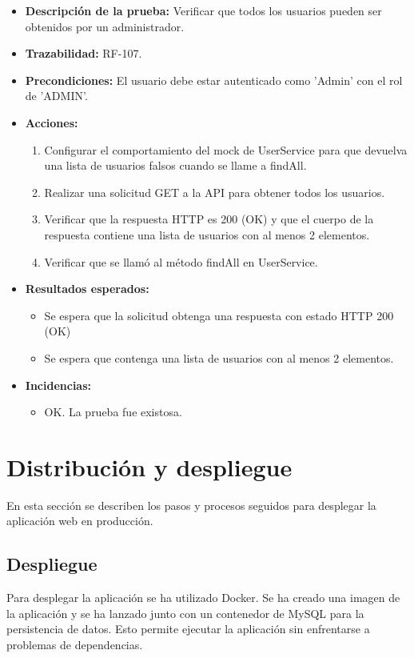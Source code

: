 \begin{itemize}
    \item \textbf{Descripción de la prueba:} Verificar que todos los usuarios pueden ser obtenidos por un administrador.
    \item \textbf{Trazabilidad:} RF-107.
    \item \textbf{Precondiciones:} El usuario debe estar autenticado como 'Admin' con el rol de 'ADMIN'.
    \item \textbf{Acciones:}
    \begin{enumerate}
        \item Configurar el comportamiento del mock de UserService para que devuelva una lista de usuarios falsos cuando se llame a findAll.
        \item Realizar una solicitud GET a la API para obtener todos los usuarios.
        \item Verificar que la respuesta HTTP es 200 (OK) y que el cuerpo de la respuesta contiene una lista de usuarios con al menos 2 elementos.
        \item Verificar que se llamó al método findAll en UserService.
    \end{enumerate}
    \item \textbf{Resultados esperados:}
    \begin{itemize}
        \item Se espera que la solicitud obtenga una respuesta con estado HTTP 200 (OK) 
        \item Se espera que contenga una lista de usuarios con al menos 2 elementos.
    \end{itemize}
    \item \textbf{Incidencias:}
    \begin{itemize}
        \item OK. La prueba fue existosa.
    \end{itemize}
\end{itemize}

\section{Distribución y despliegue}
En esta sección se describen los pasos y procesos seguidos para desplegar la aplicación web en producción.
\subsection{Despliegue}
Para desplegar la aplicación se ha utilizado Docker. Se ha creado una imagen de la aplicación y se ha lanzado junto con un contenedor de MySQL para la persistencia de datos.
Esto permite ejecutar la aplicación sin enfrentarse a problemas de dependencias.

